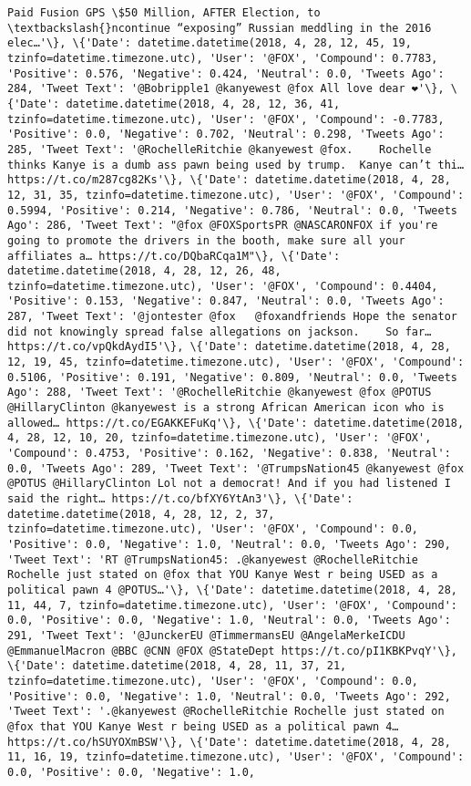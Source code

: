 \documentclass[11pt]{article}
\begin{document}
\begin{Verbatim}[commandchars=\\\{\}]
Paid Fusion GPS \$50 Million, AFTER Election, to \textbackslash{}ncontinue “exposing” Russian meddling in the 2016 elec…'\}, \{'Date': datetime.datetime(2018, 4, 28, 12, 45, 19, tzinfo=datetime.timezone.utc), 'User': '@FOX', 'Compound': 0.7783, 'Positive': 0.576, 'Negative': 0.424, 'Neutral': 0.0, 'Tweets Ago': 284, 'Tweet Text': '@Bobripple1 @kanyewest @fox All love dear ❤️'\}, \{'Date': datetime.datetime(2018, 4, 28, 12, 36, 41, tzinfo=datetime.timezone.utc), 'User': '@FOX', 'Compound': -0.7783, 'Positive': 0.0, 'Negative': 0.702, 'Neutral': 0.298, 'Tweets Ago': 285, 'Tweet Text': '@RochelleRitchie @kanyewest @fox.    Rochelle thinks Kanye is a dumb ass pawn being used by trump.  Kanye can’t thi… https://t.co/m287cg82Ks'\}, \{'Date': datetime.datetime(2018, 4, 28, 12, 31, 35, tzinfo=datetime.timezone.utc), 'User': '@FOX', 'Compound': 0.5994, 'Positive': 0.214, 'Negative': 0.786, 'Neutral': 0.0, 'Tweets Ago': 286, 'Tweet Text': "@fox @FOXSportsPR @NASCARONFOX if you're going to promote the drivers in the booth, make sure all your affiliates a… https://t.co/DQbaRCqa1M"\}, \{'Date': datetime.datetime(2018, 4, 28, 12, 26, 48, tzinfo=datetime.timezone.utc), 'User': '@FOX', 'Compound': 0.4404, 'Positive': 0.153, 'Negative': 0.847, 'Neutral': 0.0, 'Tweets Ago': 287, 'Tweet Text': '@jontester @fox   @foxandfriends Hope the senator did not knowingly spread false allegations on jackson.    So far… https://t.co/vpQkdAydI5'\}, \{'Date': datetime.datetime(2018, 4, 28, 12, 19, 45, tzinfo=datetime.timezone.utc), 'User': '@FOX', 'Compound': 0.5106, 'Positive': 0.191, 'Negative': 0.809, 'Neutral': 0.0, 'Tweets Ago': 288, 'Tweet Text': '@RochelleRitchie @kanyewest @fox @POTUS @HillaryClinton @kanyewest is a strong African American icon who is allowed… https://t.co/EGAKKEFuKq'\}, \{'Date': datetime.datetime(2018, 4, 28, 12, 10, 20, tzinfo=datetime.timezone.utc), 'User': '@FOX', 'Compound': 0.4753, 'Positive': 0.162, 'Negative': 0.838, 'Neutral': 0.0, 'Tweets Ago': 289, 'Tweet Text': '@TrumpsNation45 @kanyewest @fox @POTUS @HillaryClinton Lol not a democrat! And if you had listened I said the right… https://t.co/bfXY6YtAn3'\}, \{'Date': datetime.datetime(2018, 4, 28, 12, 2, 37, tzinfo=datetime.timezone.utc), 'User': '@FOX', 'Compound': 0.0, 'Positive': 0.0, 'Negative': 1.0, 'Neutral': 0.0, 'Tweets Ago': 290, 'Tweet Text': 'RT @TrumpsNation45: .@kanyewest @RochelleRitchie Rochelle just stated on @fox that YOU Kanye West r being USED as a political pawn 4 @POTUS…'\}, \{'Date': datetime.datetime(2018, 4, 28, 11, 44, 7, tzinfo=datetime.timezone.utc), 'User': '@FOX', 'Compound': 0.0, 'Positive': 0.0, 'Negative': 1.0, 'Neutral': 0.0, 'Tweets Ago': 291, 'Tweet Text': '@JunckerEU @TimmermansEU @AngelaMerkeICDU @EmmanuelMacron @BBC @CNN @FOX @StateDept https://t.co/pI1KBKPvqY'\}, \{'Date': datetime.datetime(2018, 4, 28, 11, 37, 21, tzinfo=datetime.timezone.utc), 'User': '@FOX', 'Compound': 0.0, 'Positive': 0.0, 'Negative': 1.0, 'Neutral': 0.0, 'Tweets Ago': 292, 'Tweet Text': '.@kanyewest @RochelleRitchie Rochelle just stated on @fox that YOU Kanye West r being USED as a political pawn 4… https://t.co/hSUYOXmBSW'\}, \{'Date': datetime.datetime(2018, 4, 28, 11, 16, 19, tzinfo=datetime.timezone.utc), 'User': '@FOX', 'Compound': 0.0, 'Positive': 0.0, 'Negative': 1.0, 
\end{Verbatim}
\end{document}
